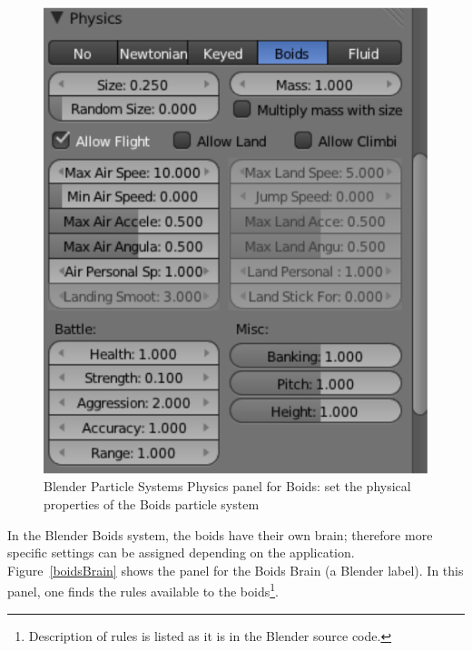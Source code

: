 \begin{figure}[htbp]
\begin{center}
\includegraphics[scale = 0.65]{figures/boidsPhysics.pdf} 
\caption{Blender Particle Systems Physics panel for Boids: set the physical properties of the Boids particle system}
\label{boidsPhysics}
\end{center}
\end{figure}

In the Blender Boids system, the boids have their own brain; 
therefore more specific settings can be assigned depending on the application. 
Figure~\ref{boidsBrain} shows the panel for the Boids Brain (a Blender label). In this panel, one finds the rules available to the boids\footnote{Description of rules is listed as it is in the Blender source code.}.

